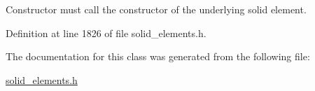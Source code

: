 Constructor must call the constructor of the underlying solid element. 



Definition at line 1826 of file solid\+\_\+elements.\+h.



The documentation for this class was generated from the following file\+:\begin{DoxyCompactItemize}
\item 
\hyperlink{solid__elements_8h}{solid\+\_\+elements.\+h}\end{DoxyCompactItemize}
